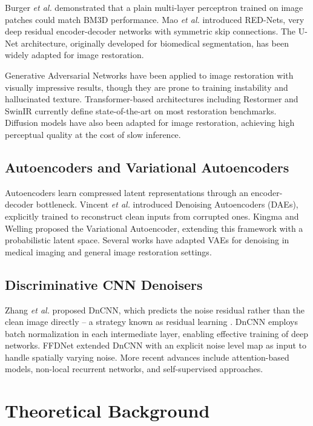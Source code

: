 \documentclass[conference]{IEEEtran}
\begin{document}
Burger \textit{et al.} demonstrated that a plain multi-layer perceptron
trained on image patches could match BM3D performance. Mao \textit{et al.}
introduced RED-Nets, very deep residual encoder-decoder networks with
symmetric skip connections. The U-Net architecture, originally developed
for biomedical segmentation, has been widely adapted for image restoration.

Generative Adversarial Networks have been applied to image restoration
with visually impressive results, though they are prone to training
instability and hallucinated texture. Transformer-based architectures
including Restormer and SwinIR currently define state-of-the-art on most
restoration benchmarks. Diffusion models have also been adapted for image
restoration, achieving high perceptual quality at the cost of slow
inference.

\subsection{Autoencoders and Variational Autoencoders}

Autoencoders learn compressed latent representations through an
encoder-decoder bottleneck. Vincent \textit{et al.} introduced Denoising
Autoencoders (DAEs), explicitly trained to reconstruct clean inputs from
corrupted ones. Kingma and Welling \cite{kingma2014vae} proposed the
Variational Autoencoder, extending this framework with a probabilistic
latent space. Several works have adapted VAEs for denoising in medical
imaging and general image restoration settings.

\subsection{Discriminative CNN Denoisers}

Zhang \textit{et al.} \cite{zhang2017beyond} proposed DnCNN, which
predicts the noise residual rather than the clean image directly -- a
strategy known as residual learning \cite{he2016deep}. DnCNN employs
batch normalization in each intermediate layer, enabling effective
training of deep networks. FFDNet extended DnCNN with an explicit noise
level map as input to handle spatially varying noise. More recent advances
include attention-based models, non-local recurrent networks, and
self-supervised approaches.

\section{Theoretical Background}
\end{document}
